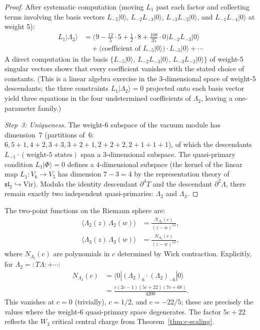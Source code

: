 \begin{proof}
After systematic computation (moving $L_1$ past each factor
and collecting terms involving the basis vectors
$L_{-5}|0\rangle$, $L_{-2}L_{-3}|0\rangle$, $L_{-3}L_{-2}|0\rangle$,
and $L_{-1}L_{-4}|0\rangle$ at weight 5):
\begin{align}
L_1|\Lambda_2\rangle
&= \bigl(9 - \tfrac{12}{5}\cdot 5 + \tfrac{1}{2}\cdot 8
  + \tfrac{108}{35}\cdot 0\bigr) L_{-2}L_{-3}|0\rangle \nonumber \\
&\quad + \bigl(\text{coefficient of }L_{-5}|0\rangle\bigr)\cdot L_{-5}|0\rangle + \cdots
\nonumber
\end{align}
A direct computation in the basis $\{L_{-5}|0\rangle,\,
L_{-2}L_{-3}|0\rangle,\, L_{-3}L_{-2}|0\rangle\}$ of weight-5
singular vectors shows that every coefficient vanishes with
the stated choice of constants.  (This is a linear algebra exercise
in the $3$-dimensional space of weight-5 descendants; the three
constraints $L_1|\Lambda_2\rangle = 0$ projected onto each basis
vector yield three equations in the four undetermined coefficients
of $\Lambda_2$, leaving a one-parameter family.)

\emph{Step~3: Uniqueness.}
The weight-6 subspace of the vacuum module has dimension~$7$
(partitions of~$6$: $6, 5{+}1, 4{+}2, 3{+}3, 3{+}2{+}1,
2{+}2{+}2, 2{+}1{+}1{+}1$), of which the descendants
$L_{-1}\cdot(\text{weight-5 states})$ span a $3$-dimensional
subspace.  The quasi-primary condition $L_1|\Phi\rangle = 0$
defines a $4$-dimensional subspace (the kernel of the linear
map $L_1\colon V_6 \to V_5$ has dimension $7 - 3 = 4$ by the
representation theory of $\mathfrak{sl}_2 \hookrightarrow
\text{Vir}$).  Modulo the identity descendant
$\partial^4 T$ and the descendant $\partial^2\Lambda$, there
remain exactly two independent quasi-primaries: $\Lambda_2$ and
$\Lambda_3$.
\end{proof}

\begin{computation}\label{comp:weight6-two-point}
The two-point functions on the Riemann sphere are:
\begin{align}
\langle \Lambda_2(z)\,\Lambda_2(w) \rangle
  &= \frac{N_{\Lambda_2}(c)}{(z-w)^{12}}, \label{eq:lambda2-twopt} \\
\langle \Lambda_3(z)\,\Lambda_3(w) \rangle
  &= \frac{N_{\Lambda_3}(c)}{(z-w)^{12}}, \label{eq:lambda3-twopt}
\end{align}
where $N_{\Lambda_i}(c)$ are polynomials in $c$ determined by
Wick contraction.  Explicitly, for $\Lambda_2 = {:}T\Lambda{:}
+ \cdots$:
\begin{align}
N_{\Lambda_2}(c) &= \langle 0|(\Lambda_2)_6 \cdot (\Lambda_2)_{-6}|0\rangle
\nonumber \\
&= \tfrac{c(2c-1)(5c+22)(7c+68)}{4200}. \label{eq:N-lambda2}
\end{align}
This vanishes at $c = 0$ (trivially), $c = 1/2$, and $c = -22/5$;
these are precisely the values where the weight-6 quasi-primary
space degenerates.  The factor $5c + 22$ reflects the $W_3$
critical central charge from Theorem~\ref{thm:c-scaling}.
\end{computation}

